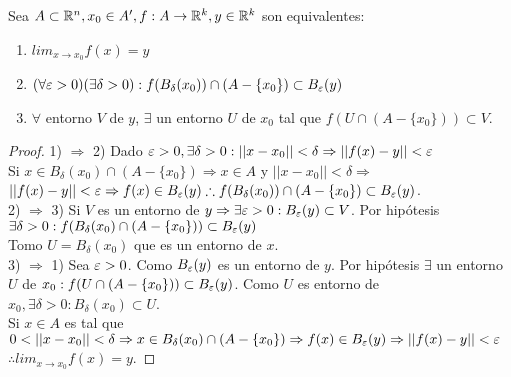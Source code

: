 \begin{prop}
  Sea $A \subset \mathbb{R}^n, x_0 \in A^{\prime}, f: A \to \mathbb{R}^k, y \in \mathbb{R}^k$ son equivalentes:
  \begin{enumerate}
    \item $lim_{x \to x_0} f(x) = y$ 
    \item $(\forall \varepsilon > 0)(\exists \delta > 0) : f(B_{\delta}(x_0)) \cap (A - \{x_0\}) \subset B_{\varepsilon}(y)$
    \item $\forall$ entorno $V$ de $y$, $\exists$ un entorno $U$ de $x_0$ tal que $f(U \cap (A - \{x_0\})) \subset V$.
  \end{enumerate}

  \begin{proof}
    1) $\Rightarrow$ 2) Dado $\varepsilon > 0, \exists \delta > 0 : ||x - x_0 || < \delta \Rightarrow ||f(x) - y|| < \varepsilon$ \\
    Si $x \in B_{\delta}(x_0) \cap (A - \{x_0\}) \Rightarrow x \in A$ y $||x - x_0|| < \delta \Rightarrow$ \\
    $||f(x) - y|| < \varepsilon \Rightarrow f(x) \in B_{\varepsilon}(y) \therefore f(B_{\delta}(x_0)) \cap (A - \{x_0\}) \subset B_{\varepsilon}(y)$. \\

    2) $\Rightarrow$ 3) Si $V$ es un entorno de $y \Rightarrow \exists \varepsilon > 0 : B_{\varepsilon}(y) \subset V$. Por hipótesis $\exists \delta > 0 : f(B_{\delta}(x_0) \cap (A - \{x_0\})) \subset B_{\varepsilon}(y)$ \\
    Tomo $U = B_{\delta}(x_0)$ que es un entorno de $x$. \\

    3) $\Rightarrow$ 1) Sea $\varepsilon > 0$. Como $B_{\varepsilon}(y)$ es un entorno de $y$. Por hipótesis $\exists$ un entorno $U$ de $x_0 : f(U \cap (A - \{x_0\})) \subset B_{\varepsilon}(y)$. Como $U$ es entorno de $x_0, \exists \delta > 0 : B_{\delta}(x_0) \subset U$. \\
    Si $x \in A$ es tal que $0 < ||x - x_0|| < \delta \Rightarrow x \in B_{\delta}(x_0) \cap (A - \{x_0\}) \Rightarrow f(x) \in B_{\varepsilon}(y) \Rightarrow ||f(x) - y|| < \varepsilon$ \\
    $\therefore lim_{x \to x_0} f(x) = y$.
  \end{proof}
\end{prop}


